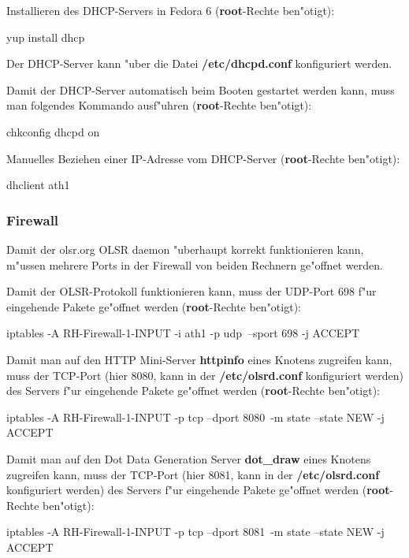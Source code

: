 Installieren des DHCP-Servers in Fedora 6 (\textbf{root}-Rechte ben"otigt):
\begin{shelllst}
yup install dhcp
\end{shelllst}

Der DHCP-Server kann "uber die Datei \textbf{/etc/dhcpd.conf} konfiguriert
werden.

Damit der DHCP-Server automatisch beim Booten gestartet werden kann,
muss man folgendes Kommando ausf"uhren (\textbf{root}-Rechte ben"otigt):
\begin{shelllst}
chkconfig dhcpd on
\end{shelllst}

Manuelles Beziehen einer IP-Adresse vom DHCP-Server
(\textbf{root}-Rechte ben"otigt):
\begin{shelllst}
dhclient ath1
\end{shelllst}

\subsubsection{Firewall}

Damit der olsr.org OLSR daemon "uberhaupt korrekt funktionieren kann,
m"ussen mehrere Ports in der Firewall von beiden Rechnern ge"offnet werden.

Damit der OLSR-Protokoll funktionieren kann, muss der UDP-Port 698
f"ur eingehende Pakete ge"offnet werden (\textbf{root}-Rechte ben"otigt):
\begin{shelllst}
iptables -A RH-Firewall-1-INPUT -i ath1 -p udp\
	--sport 698 -j ACCEPT
\end{shelllst}

Damit man auf den HTTP Mini-Server \textbf{httpinfo} eines Knotens zugreifen
kann, muss der TCP-Port
(hier 8080, kann in der \textbf{/etc/olsrd.conf} konfiguriert werden)
des Servers f"ur eingehende Pakete ge"offnet werden
(\textbf{root}-Rechte ben"otigt):
\begin{shelllst}
iptables -A RH-Firewall-1-INPUT -p tcp --dport 8080\
	-m state --state NEW -j ACCEPT
\end{shelllst}

Damit man auf den Dot Data Generation Server \textbf{dot\_draw}
eines Knotens zugreifen kann, muss der TCP-Port
(hier 8081, kann in der \textbf{/etc/olsrd.conf} konfiguriert werden)
des Servers f"ur eingehende Pakete ge"offnet werden
(\textbf{root}-Rechte ben"otigt):
\begin{shelllst}
iptables -A RH-Firewall-1-INPUT -p tcp --dport 8081\
	-m state --state NEW -j ACCEPT
\end{shelllst}

